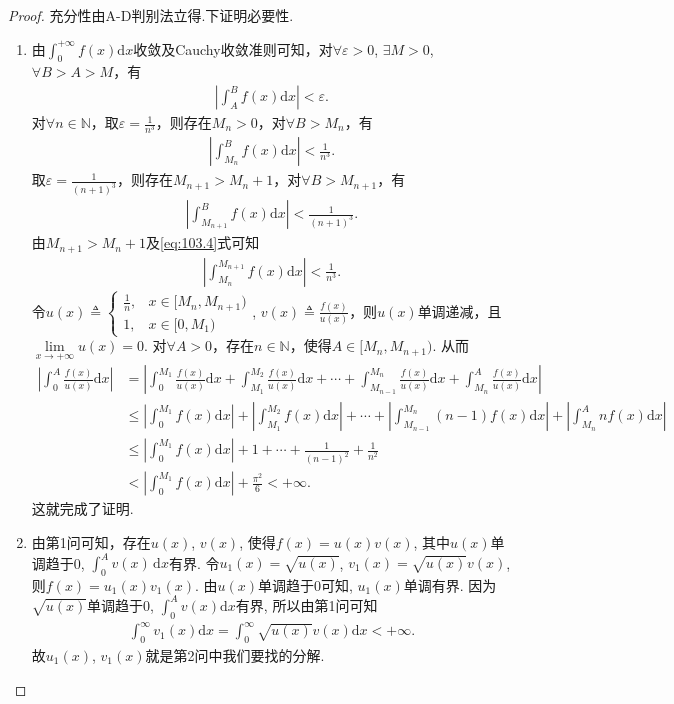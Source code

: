 \documentclass[../../main.tex]{subfiles}
\begin{document}
\begin{proof}
充分性由A-D判别法立得.下证明必要性.
\begin{enumerate}
\item 由$\int_0^{+\infty} f(x)\mathrm{d}x$收敛及Cauchy收敛准则可知，对$\forall \varepsilon >0$, $\exists M>0$, $\forall B>A>M$，有
\begin{align*}
\left| \int_A^B f(x)\mathrm{d}x \right| < \varepsilon.
\end{align*}
对$\forall n\in \mathbb{N}$，取$\varepsilon = \frac{1}{n^3}$，则存在$M_n>0$，对$\forall B>M_n$，有
\begin{align}
\left| \int_{M_n}^B f(x)\mathrm{d}x \right| < \frac{1}{n^3}. \label{eq:103.4}
\end{align}
取$\varepsilon = \frac{1}{(n+1)^3}$，则存在$M_{n+1}>M_n+1$，对$\forall B>M_{n+1}$，有
\begin{align*}
\left| \int_{M_{n+1}}^B f(x)\mathrm{d}x \right| < \frac{1}{(n+1)^3}.
\end{align*}
由$M_{n+1}>M_n+1$及\eqref{eq:103.4}式可知
\begin{align*}
\left| \int_{M_n}^{M_{n+1}} f(x)\mathrm{d}x \right| < \frac{1}{n^3}.
\end{align*}
令$u(x) \triangleq \begin{cases} 
\frac{1}{n}, & x\in [M_n, M_{n+1}) \\
1, & x\in [0, M_1)
\end{cases}$, $v(x) \triangleq \frac{f(x)}{u(x)}$，则$u(x)$单调递减，且$\lim\limits_{x\rightarrow +\infty} u(x) = 0$.
对$\forall A>0$，存在$n\in \mathbb{N}$，使得$A\in [M_n, M_{n+1})$. 从而
\begin{align*}
\left| \int_0^A \frac{f(x)}{u(x)}\mathrm{d}x \right| &= \left| \int_0^{M_1} \frac{f(x)}{u(x)}\mathrm{d}x + \int_{M_1}^{M_2} \frac{f(x)}{u(x)}\mathrm{d}x + \cdots + \int_{M_{n-1}}^{M_n} \frac{f(x)}{u(x)}\mathrm{d}x + \int_{M_n}^A \frac{f(x)}{u(x)}\mathrm{d}x \right| \\
&\leqslant \left| \int_0^{M_1} f(x)\mathrm{d}x \right| + \left| \int_{M_1}^{M_2} f(x)\mathrm{d}x \right| + \cdots + \left| \int_{M_{n-1}}^{M_n} (n-1)f(x)\mathrm{d}x \right| + \left| \int_{M_n}^A nf(x)\mathrm{d}x \right| \\
&\leqslant \left| \int_0^{M_1} f(x)\mathrm{d}x \right| + 1 + \cdots + \frac{1}{(n-1)^2} + \frac{1}{n^2} \\
&< \left| \int_0^{M_1} f(x)\mathrm{d}x \right| + \frac{\pi^2}{6} < +\infty.
\end{align*}
这就完成了证明.

\item 由第1问可知，存在$u(x)$, $v(x)$, 使得$f(x)=u(x)v(x)$, 其中$u(x)$单调趋于0, $\int_0^A v(x)\,\mathrm{d}x$有界. 令$u_1(x)=\sqrt{u(x)}$, $v_1(x)=\sqrt{u(x)}v(x)$, 则$f(x)=u_1(x)v_1(x)$. 由$u(x)$单调趋于0可知, $u_1(x)$单调有界. 因为$\sqrt{u(x)}$单调趋于0, $\int_0^A v(x)\mathrm{d}x$有界, 所以由第1问可知
\begin{align*}
\int_0^{\infty} v_1(x)\mathrm{d}x=\int_0^{\infty} \sqrt{u(x)}v(x)\mathrm{d}x<+\infty.
\end{align*}
故$u_1(x)$, $v_1(x)$就是第2问中我们要找的分解.
\end{enumerate}
\end{proof}
\end{document}
